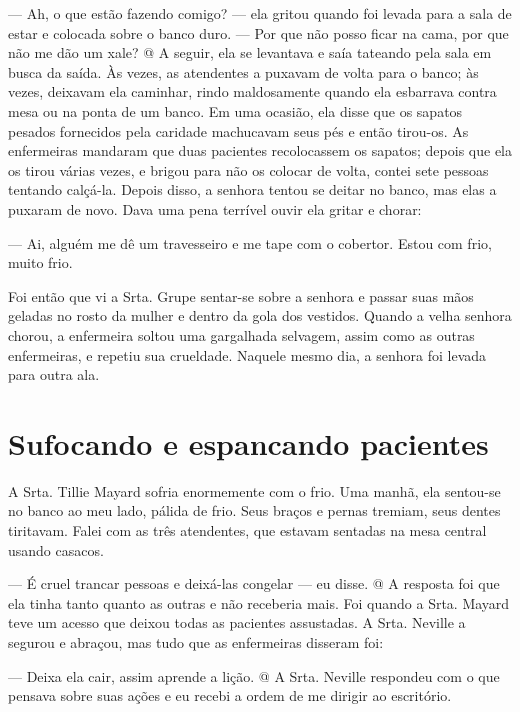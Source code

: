--- Ah, o que estão fazendo comigo? --- ela gritou quando foi levada
para a sala de estar e colocada sobre o banco duro. --- Por que não
posso ficar na cama, por que não me dão um xale? @ A seguir, ela se
levantava e saía tateando pela sala em busca da saída. Às vezes, as
atendentes a puxavam de volta para o banco; às vezes, deixavam ela
caminhar, rindo maldosamente quando ela esbarrava contra mesa ou na
ponta de um banco. Em uma ocasião, ela disse que os sapatos pesados
fornecidos pela caridade machucavam seus pés e então tirou-os. As
enfermeiras mandaram que duas pacientes recolocassem os sapatos; depois
que ela os tirou várias vezes, e brigou para não os colocar de volta,
contei sete pessoas tentando calçá-la. Depois disso, a senhora tentou se
deitar no banco, mas elas a puxaram de novo. Dava uma pena terrível
ouvir ela gritar e chorar:

--- Ai, alguém me dê um travesseiro e me tape com o cobertor. Estou com
frio, muito frio.

Foi então que vi a Srta. Grupe sentar-se sobre a senhora e passar suas
mãos geladas no rosto da mulher e dentro da gola dos vestidos. Quando a
velha senhora chorou, a enfermeira soltou uma gargalhada selvagem, assim
como as outras enfermeiras, e repetiu sua crueldade. Naquele mesmo dia,
a senhora foi levada para outra ala.

\label{section-7}

\chapter{Sufocando e espancando
pacientes}\label{capuxedtulo-xiii-sufocando-e-espancando-pacientes}

A Srta. Tillie Mayard sofria enormemente com o frio. Uma manhã, ela
sentou-se no banco ao meu lado, pálida de frio. Seus braços e pernas
tremiam, seus dentes tiritavam. Falei com as três atendentes, que
estavam sentadas na mesa central usando casacos.

--- É cruel trancar pessoas e deixá-las congelar --- eu disse. @ A
resposta foi que ela tinha tanto quanto as outras e não receberia mais.
Foi quando a Srta. Mayard teve um acesso que deixou todas as pacientes
assustadas. A Srta. Neville a segurou e abraçou, mas tudo que as
enfermeiras disseram foi:

--- Deixa ela cair, assim aprende a lição. @ A Srta. Neville respondeu
com o que pensava sobre suas ações e eu recebi a ordem de me dirigir ao
escritório.


